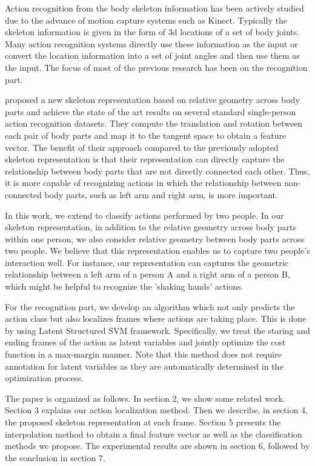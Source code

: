\documentclass[10pt,twocolumn,letterpaper]{article}
\begin{document}
Action recognition from the body skeleton information has been actively studied due to the advance of motion capture systems such as Kinect. Typically the skeleton information is given in the form of 3d locations of a set of body joints. Many action recognition systems directly use these information as the input or convert the location information into a set of joint angles and then use them as the input. The focus of most of the previous research has been on the recognition part. 

\cite{Vemulapalli2013} proposed a new skeleton representation based on relative geometry across body parts and achieve the state of the art results on several standard single-person action recognition datasets. They compute the translation and rotation between each pair of body parts and map it to the tangent space to obtain a feature vector. The benefit of their approach compared to the previously adopted skeleton representation is that their representation can directly capture the relationship between body parts that are not directly connected each other. Thus, it is more capable of recognizing actions in which the relationship between non-connected body parts, such as left arm and right arm, is more important.

In this work, we extend \cite{Vemulapalli2013} to classify actions performed by two people. In our skeleton representation, in addition to the relative geometry across body parts within one person, we also consider relative geometry between body parts across two people. We believe that this representation enables us to capture two people's interaction well. For instance, our representation can captures the geometric relationship between a left arm of a person A and a right arm of a person B, which might be helpful to recognize the 'shaking hands' actions.

For the recognition part, we develop an algorithm which not only predicts the action class but also localizes frames where actions are taking place. This is done by using Latent Structured SVM framework. Specifically, we treat the staring and ending frames of the action as latent variables and jointly optimize the cost function in a max-margin manner. Note that this method does not require annotation for latent variables as they are automatically determined in the optimization process.


The paper is organized as follows. In section 2, we show some related work. Section 3 explains our action localization method. Then we describe, in section 4, the proposed skeleton representation at each frame. Section 5 presents the interpolation method to obtain a final feature vector as well as the classification methods we propose. The experimental results are shown in section 6, followed by the conclusion in section 7.
\end{document}
